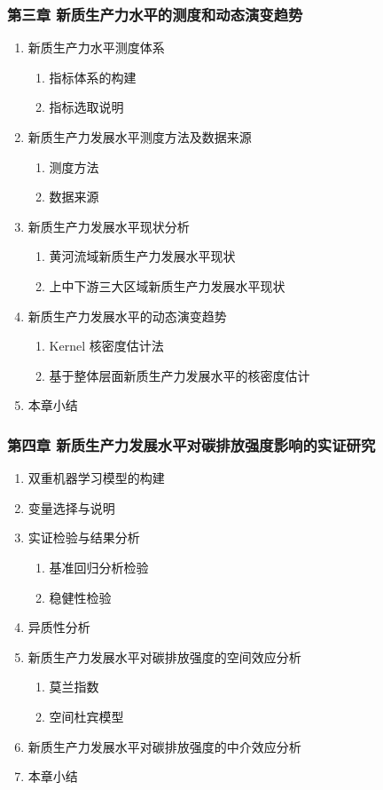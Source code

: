 \documentclass[UTF8,a4paper,zihao=-4,fontset=windows]{ctexart}
\newcommand{\regionscope}{黄河流域}
\begin{document}
\subsubsection*{第三章 新质生产力水平的测度和动态演变趋势}
\begin{enumerate}[label=3.\arabic*]
  \item 新质生产力水平测度体系
  \begin{enumerate}[label=3.1.\arabic*]
    \item 指标体系的构建
    \item 指标选取说明
  \end{enumerate}
  \item 新质生产力发展水平测度方法及数据来源
  \begin{enumerate}[label=3.2.\arabic*]
    \item 测度方法
    \item 数据来源
  \end{enumerate}
  \item 新质生产力发展水平现状分析
  \begin{enumerate}[label=3.3.\arabic*]
    \item \regionscope 新质生产力发展水平现状
    \item 上中下游三大区域新质生产力发展水平现状
  \end{enumerate}
  \item 新质生产力发展水平的动态演变趋势
  \begin{enumerate}[label=3.4.\arabic*]
    \item Kernel 核密度估计法
    \item 基于整体层面新质生产力发展水平的核密度估计
  \end{enumerate}
  \item 本章小结
\end{enumerate}

\subsubsection*{第四章 新质生产力发展水平对碳排放强度影响的实证研究}
\begin{enumerate}[label=4.\arabic*]
  \item 双重机器学习模型的构建
  \item 变量选择与说明
  \item 实证检验与结果分析
  \begin{enumerate}[label=4.3.\arabic*]
    \item 基准回归分析检验
    \item 稳健性检验
  \end{enumerate}
  \item 异质性分析
  \item 新质生产力发展水平对碳排放强度的空间效应分析
  \begin{enumerate}[label=4.5.\arabic*]
    \item 莫兰指数
    \item 空间杜宾模型
  \end{enumerate}
  \item 新质生产力发展水平对碳排放强度的中介效应分析
  \item 本章小结
\end{enumerate}
\end{document}
